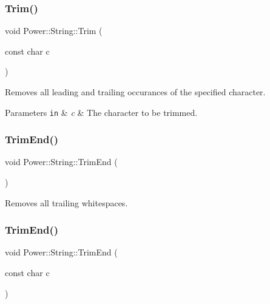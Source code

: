 \subsubsection{\texorpdfstring{Trim()}{Trim()}\hspace{0.1cm}{\footnotesize\ttfamily [2/2]}}
{\footnotesize\ttfamily void Power\+::\+String\+::\+Trim (\begin{DoxyParamCaption}\item[{const char}]{c }\end{DoxyParamCaption})\hspace{0.3cm}{\ttfamily [inline]}}



Removes all leading and trailing occurances of the specified character. 


\begin{DoxyParams}[1]{Parameters}
\mbox{\tt in}  & {\em c} & The character to be trimmed. \\
\hline
\end{DoxyParams}
\mbox{\label{class_power_1_1_string_afd4d38398e47c0ab873e90431396663b}} 
\subsubsection{\texorpdfstring{Trim\+End()}{TrimEnd()}\hspace{0.1cm}{\footnotesize\ttfamily [1/2]}}
{\footnotesize\ttfamily void Power\+::\+String\+::\+Trim\+End (\begin{DoxyParamCaption}{ }\end{DoxyParamCaption})\hspace{0.3cm}{\ttfamily [inline]}}



Removes all trailing whitespaces. 

\mbox{\label{class_power_1_1_string_aedaa5e01d3bc63c803e8c379477ba114}} 
\subsubsection{\texorpdfstring{Trim\+End()}{TrimEnd()}\hspace{0.1cm}{\footnotesize\ttfamily [2/2]}}
{\footnotesize\ttfamily void Power\+::\+String\+::\+Trim\+End (\begin{DoxyParamCaption}\item[{const char}]{c }\end{DoxyParamCaption})\hspace{0.3cm}{\ttfamily [inline]}}



